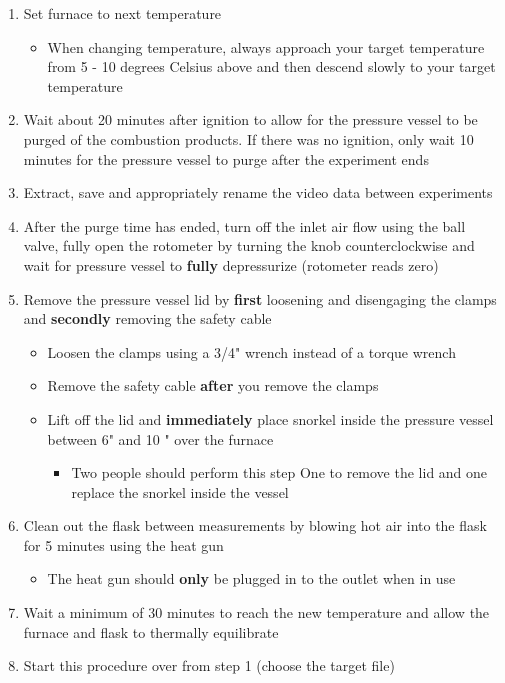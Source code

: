 \documentclass[letterpaper,11pt]{article}
\begin{document}
\begin{enumerate}
    \item Set furnace to next temperature
        \begin{itemize}
            \item When changing temperature, always approach your target
                temperature from 5 - 10 degrees Celsius above and then 
                descend slowly to your target temperature
        \end{itemize}
    \item Wait about 20 minutes after ignition to allow for the pressure 
        vessel to be purged of the combustion products. If there was no ignition,
		only wait 10 minutes for the pressure vessel to purge after the experiment ends 
    \item Extract, save and appropriately rename the video data between 
            experiments
    \item After the purge time has ended, turn off the inlet air flow using the 
        ball valve, fully open the rotometer by turning the knob counterclockwise
		and wait for pressure vessel to \textbf{fully} depressurize 
        (rotometer reads zero)
    \item Remove the pressure vessel lid by \textbf{first} loosening and 
        disengaging the clamps and \textbf{secondly} removing the safety cable
        \begin{itemize}
        \item Loosen the clamps using a 3/4" wrench instead of a 
            torque wrench
        \item Remove the safety cable \textbf{after} you remove the clamps
        \item Lift off the lid and \textbf{immediately} place snorkel inside the 
        pressure vessel between 6" and 10 " over the furnace
            \begin{itemize}
            \item Two people should perform this step One to remove the lid and one
                replace the snorkel inside the vessel
            \end{itemize}
        \end{itemize}
        
    \item Clean out the flask between measurements by blowing hot air into
            the flask for 5 minutes using the heat gun
            \begin{itemize}
            \item The heat gun should \textbf{only} be plugged in to the outlet 
                when in use
            \end{itemize}
            
        \item Wait a minimum of 30 minutes to reach the new temperature and 
            allow the furnace and flask to thermally equilibrate
    \item Start this procedure over from step 1 (choose the target file)
    \end{enumerate}
\end{document}

